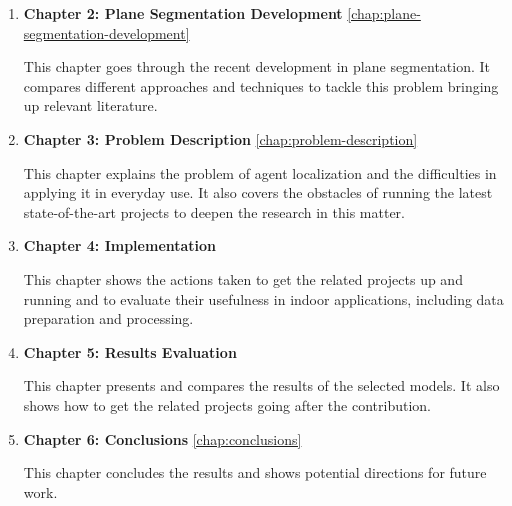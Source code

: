 \begin{enumerate}
\item \textbf{Chapter 2: Plane Segmentation Development} \ref{chap:plane-segmentation-development}

This chapter goes through the recent development in plane segmentation.
It compares different approaches and techniques to tackle this problem bringing up relevant literature.

\item \textbf{Chapter 3: Problem Description} \ref{chap:problem-description}

This chapter explains the problem of agent localization and the difficulties in applying it in everyday use.
It also covers the obstacles of running the latest state-of-the-art projects to deepen the research in this matter.

\item \textbf{Chapter 4: Implementation} \label{chap:implementation}

This chapter shows the actions taken to get the related projects up and running and to evaluate their usefulness in indoor applications,
including data preparation and processing.

\item \textbf{Chapter 5: Results Evaluation} \label{chap:results-evaluation}

This chapter presents and compares the results of the selected models.
It also shows how to get the related projects going after the contribution.

\item \textbf{Chapter 6: Conclusions} \ref{chap:conclusions}

This chapter concludes the results and shows potential directions for future work.

\end{enumerate}
